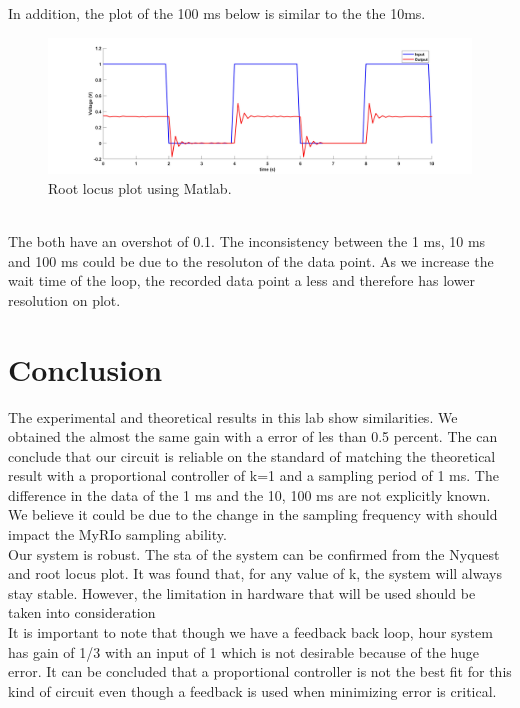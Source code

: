 \documentclass[12pt,letterpaper]{article}
\begin{document}
In addition, the plot of the 100 ms below is similar to the the 10ms.\\
\begin{figure}[h]
    \centering
    \includegraphics[width=15cm]{expstepin100.jpg}
    \caption{Root locus plot using Matlab.}
\end{figure}\\
The both have an overshot of 0.1. The inconsistency between the 1 ms, 10 ms and 100 ms 
could be due to the resoluton of the data point. As we increase the wait time of the loop,
the recorded data point a less and therefore has lower resolution on plot.
\section*{Conclusion}
The experimental and theoretical results in this lab show similarities. We obtained
the almost the same gain with a error of les than 0.5 percent. The can conclude that 
our circuit is reliable on the standard of matching the theoretical result with a proportional 
controller of k=1 and a sampling period of 1 ms. The difference in the data 
of the 1 ms and the 10, 100 ms are not explicitly known. We believe it could
be due to the change in the sampling frequency with should impact
the MyRIo sampling ability. \\
Our system is robust. The sta of the system can be confirmed from the Nyquest and root locus
plot.  It was found that, for any value of k, the system will always stay 
stable. However, the limitation in hardware that will be used should be taken 
into consideration\\
It is important to note that though we have a feedback back loop, hour system has gain of  1/3
with an input of 1 which is not desirable because of the huge error. It can be concluded that 
a proportional controller is not the best fit for this kind of circuit 
even though a feedback is used when minimizing error is critical.
\end{document}

